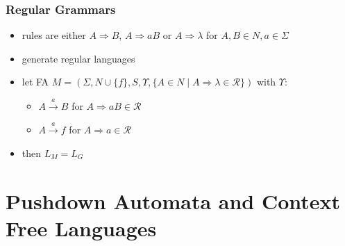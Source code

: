 \documentclass{beamer}
\begin{document}
\begin{frame}
\frametitle{Regular Grammars}
  \begin{itemize}
  \item rules are either $A \Rightarrow B$,
    $A \Rightarrow aB$ or $A \Rightarrow \lambda$ for $A, B \in N, a \in \Sigma$
  \item generate regular languages
  \item let FA $M = (\Sigma, N \cup \{f\}, S, \Upsilon, \{A \in N \mid A
    \Rightarrow \lambda \in \mathcal{R}\})$ with $\Upsilon$:
    \begin{itemize}
      \item $A \xrightarrow{a} B$ for $A \Rightarrow aB \in \mathcal{R}$
      \item $A \xrightarrow{a} f$ for $A \Rightarrow a \in \mathcal{R}$
    \end{itemize}
  \item then $L_M = L_G$
  \end{itemize}
\end{frame}

\section{Pushdown Automata and Context Free Languages}

\end{document}
